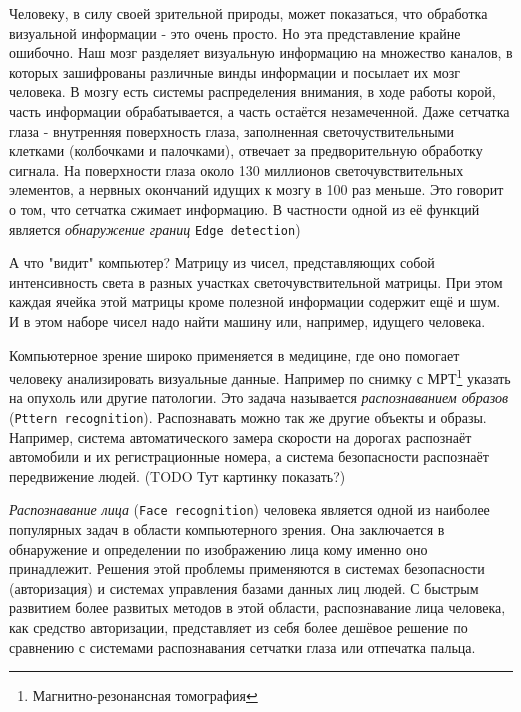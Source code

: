 \documentclass[12pt]{report}
\begin{document}
Человеку, в силу своей зрительной природы, может показаться, что обработка визуальной информации - это очень просто. Но эта представление крайне ошибочно. Наш мозг разделяет визуальную информацию на множество каналов, в которых зашифрованы различные винды информации и посылает их мозг человека. В мозгу есть системы распределения внимания, в ходе работы корой, часть информации обрабатывается, а часть остаётся незамеченной. \citep{bradski2008learning} Даже сетчатка глаза - внутренняя поверхность глаза, заполненная светочуствительными клетками (колбочками и палочками), отвечает за предворительную обработку сигнала. На поверхности глаза около 130 миллионов светочувствительных элементов, а нервных окончаний идущих к мозгу в 100 раз меньше. Это говорит о том, что сетчатка сжимает информацию. В частности одной из её функций является \emph{обнаружение границ} \texttt{Edge detection}) \citep{RetinaOnWiki}

А что "видит" компьютер? Матрицу из чисел, представляющих собой интенсивность света в разных участках светочувствительной матрицы. При этом каждая ячейка этой матрицы кроме полезной информации содержит ещё и шум. И в этом наборе чисел надо найти машину или, например, идущего человека.

Компьютерное зрение широко применяется в медицине, где оно помогает человеку анализировать визуальные данные. Например по снимку с МРТ\footnote{Магнитно-резонансная томография} указать на опухоль или другие патологии. Это задача называется \emph{распознаванием образов} (\texttt{Pttern recognition}). Распознавать можно так же другие объекты и образы. Например, система автоматического замера скорости на дорогах распознаёт автомобили и их регистрационные номера, а система безопасности распознаёт передвижение людей.
(TODO Тут картинку показать?)


\emph{Распознавание лица} (\texttt{Face recognition}) человека является одной из наиболее популярных задач в области компьютерного зрения. Она заключается в обнаружение и определении по изображению лица кому именно оно принадлежит. Решения этой проблемы применяются в системах безопасности (авторизация) и системах управления базами данных лиц людей. %
С быстрым развитием более развитых методов в этой области, распознавание лица человека, как средство авторизации, представляет из себя более дешёвое решение по сравнению с системами распознавания сетчатки глаза или отпечатка пальца. \citep{kumar2006efficient}
\end{document}
